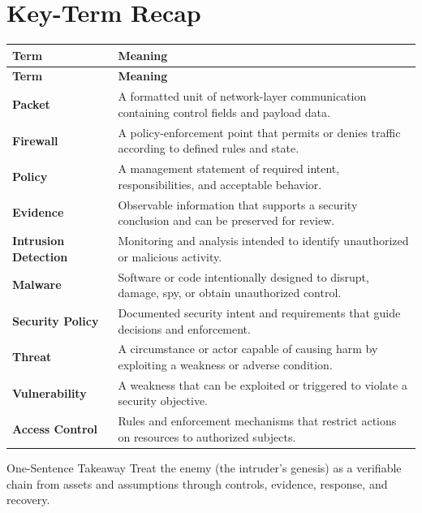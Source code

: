 \documentclass[11pt,letterpaper]{article}
\begin{document}
\section*{Key-Term Recap}
\begin{longtable}{>{\raggedright\arraybackslash}p{}>{\raggedright\arraybackslash}p{}}
\toprule\rowcolor{Navy}\color{white}\textbf{Term} & \color{white}\textbf{Meaning}\\\midrule
\endfirsthead
\toprule\rowcolor{Navy}\color{white}\textbf{Term} & \color{white}\textbf{Meaning}\\\midrule
\endhead
\textbf{Packet} & A formatted unit of network-layer communication containing control fields and payload data. \\\midrule
\textbf{Firewall} & A policy-enforcement point that permits or denies traffic according to defined rules and state. \\\midrule
\textbf{Policy} & A management statement of required intent, responsibilities, and acceptable behavior. \\\midrule
\textbf{Evidence} & Observable information that supports a security conclusion and can be preserved for review. \\\midrule
\textbf{Intrusion Detection} & Monitoring and analysis intended to identify unauthorized or malicious activity. \\\midrule
\textbf{Malware} & Software or code intentionally designed to disrupt, damage, spy, or obtain unauthorized control. \\\midrule
\textbf{Security Policy} & Documented security intent and requirements that guide decisions and enforcement. \\\midrule
\textbf{Threat} & A circumstance or actor capable of causing harm by exploiting a weakness or adverse condition. \\\midrule
\textbf{Vulnerability} & A weakness that can be exploited or triggered to violate a security objective. \\\midrule
\textbf{Access Control} & Rules and enforcement mechanisms that restrict actions on resources to authorized subjects. \\\midrule
\bottomrule
\end{longtable}
\begin{CornellExamBox}{One-Sentence Takeaway}
Treat the enemy (the intruder's genesis) as a verifiable chain from assets and assumptions through controls, evidence, response, and recovery.
\end{CornellExamBox}
\end{document}
